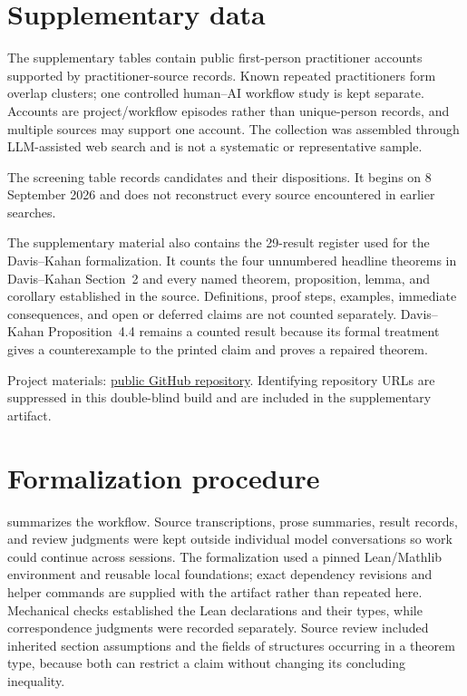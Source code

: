 \section{Supplementary data}
\label{app:data}

The supplementary tables contain \PractitionerAccountCount{} public
first-person practitioner accounts supported by \PractitionerSourceCount{}
practitioner-source records.  Known repeated practitioners form
\PractitionerOverlapClusterCount{} overlap clusters; one controlled human--AI
workflow study is kept separate.  Accounts are project/workflow episodes rather
than unique-person records, and multiple sources may support one account.  The
collection was assembled through LLM-assisted web search and is not a systematic
or representative sample.

The screening table records \PractitionerScreenedCandidateCount{} candidates and
their dispositions.  It begins on 8 September 2026 and does not reconstruct
every source encountered in earlier searches.

The supplementary material also contains the 29-result register used for the
Davis--Kahan formalization.  It counts the four unnumbered headline theorems in
Davis--Kahan Section~2 and every named theorem, proposition, lemma, and corollary
established in the source.  Definitions, proof steps, examples, immediate
consequences, and open or deferred claims are not counted separately.
Davis--Kahan Proposition~4.4 remains a counted result because its formal
treatment gives a counterexample to the printed claim and proves a repaired
theorem.

\ifshowartifacturl
Project materials: \href{\artifacturl}{public GitHub repository}.
\else
Identifying repository URLs are suppressed in this double-blind build and are
included in the supplementary artifact.
\fi

\section{Formalization procedure}
\label{app:system}

 summarizes the workflow.  Source transcriptions, prose
summaries, result records, and review judgments were kept outside individual
model conversations so work could continue across sessions.  The formalization
used a pinned Lean/Mathlib environment and reusable local foundations; exact
dependency revisions and helper commands are supplied with the artifact rather
than repeated here.  Mechanical checks established the Lean declarations and
their types, while correspondence judgments were recorded separately.  Source
review included inherited section assumptions and the fields of structures
occurring in a theorem type, because both can restrict a claim without changing
its concluding inequality.

